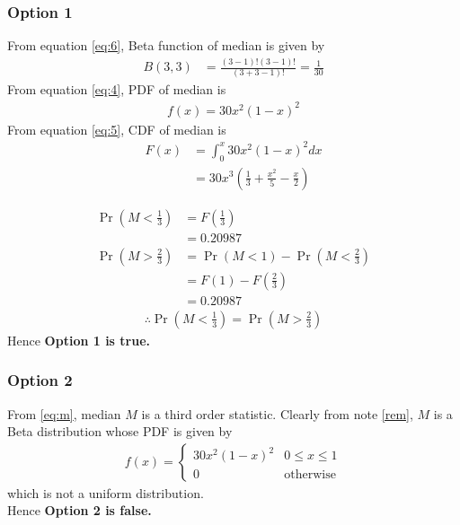 \documentclass{beamer}
\providecommand{\pr}[1]{\ensuremath{\Pr\left(#1\right)}}
\begin{document}
\begin{frame}
\frametitle{Option 1}
From equation \eqref{eq:6}, Beta function of median is given by
\begin{align}
    B(3,3)&=\frac{(3-1)!(3-1)!}{(3+3-1)!}=\frac{1}{30}
 \end{align}
 From equation \eqref{eq:4}, PDF of median is
 \begin{align}
     f(x)=30x^{2}(1-x)^{2}
 \end{align}
 From equation \eqref{eq:5}, CDF of median is 
 \begin{align}
     F(x)&=\int_{0}^{x}30x^{2}(1-x)^{2}dx\\
     &=30x^{3}\left(\frac{1}{3}+\frac{x^2}{5}-\frac{x}{2}\right)
 \end{align}
 \end{frame}
 \begin{frame}
 \begin{align}
     \pr{M<\frac{1}{3}}&=F\left(\frac{1}{3}\right)\\
     &=0.20987\\
     \pr{M>\frac{2}{3}}&=\pr{M<1}-\pr{M<\frac{2}{3}}\\
     &=F(1)-F\left(\frac{2}{3}\right)\\
     &=0.20987
      \end{align}
 \begin{align}
      \therefore \pr{M<\frac{1}{3}}=\pr{M>\frac{2}{3}}
 \end{align}
  Hence \textbf{Option 1 is true.}
\end{frame}
\begin{frame}
\frametitle{Option 2}
From \eqref{eq:m}, median $M$ is a third order statistic. Clearly from note \eqref{rem}, $M$ is a Beta distribution whose PDF is given by
\begin{align}
    f(x)=
    \begin{cases}
    30x^{2}(1-x)^{2} & 0 \leq x \leq 1\\
    0 & \text{otherwise}
    \end{cases}\label{eq:25}
\end{align}
which is not a uniform distribution.
\\Hence \textbf{Option 2 is false.}
    
\end{frame}
\end{document}
